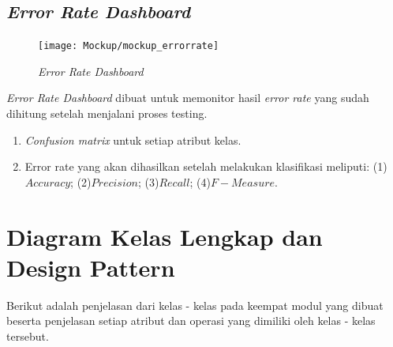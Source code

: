 \subsection{\textit{Error Rate Dashboard}}
\begin{figure}[H]
	\centering
	\texttt{[image: Mockup/mockup\_errorrate]}
	\caption[\textit{Error Rate Dashboard}]{\textit{Error Rate Dashboard}}
	\label{fig:Error Rate Dashboard}
\end{figure}
\textit{Error Rate Dashboard} dibuat untuk memonitor hasil \textit{error rate} yang sudah dihitung setelah menjalani proses testing. 
\begin{enumerate}
	\item \textit{Confusion matrix} untuk setiap atribut kelas.
	\item Error rate yang akan dihasilkan setelah melakukan klasifikasi meliputi: (1)$Accuracy$; (2)$Precision$; (3)$Recall$; (4)$F-Measure$.
\end{enumerate}



\section{Diagram Kelas Lengkap dan Design Pattern}
Berikut adalah penjelasan dari kelas - kelas pada keempat modul yang dibuat beserta penjelasan setiap atribut dan operasi yang dimiliki oleh kelas - kelas tersebut.

